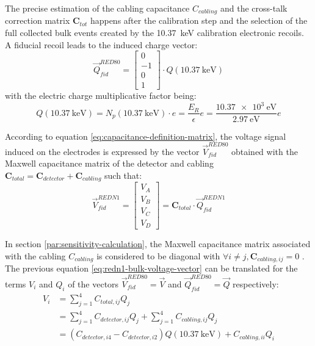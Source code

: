 The precise estimation of the cabling capacitance $C_{cabling}$ and the cross-talk correction matrix $\bm{C}_{tot}$ happens after the calibration step and the selection of the full collected bulk events created by the \SI{10.37}{\kilo\eV} calibration electronic recoils.
A fiducial recoil leads to the induced charge vector:
\begin{equation}
\vec{Q}_{fid}^{RED80} =
\begin{bmatrix}
0 \\ -1 \\ 0 \\ 1
\end{bmatrix}
\cdot Q(\SI{10.37}{\kilo\eV})
\end{equation}
with the electric charge multiplicative factor being:
\begin{equation}
Q(\SI{10.37}{\kilo\eV})
=
N_p(\SI{10.37}{\kilo\eV}) \cdot e
=
\frac{E_R}{\epsilon} e
=
\frac{\SI{10.37e3}{\eV}}{\SI{2.97}{\eV}} e
\end{equation}

According to equation \ref{eq:capacitance-definition-matrix}, the voltage signal induced on the electrodes is expressed by the vector $\vec{V}_{fid}^{RED80}$ obtained with the Maxwell capacitance matrix  of the detector and cabling $\bm{C}_{total} = \bm{C}_{detector} + \bm{C}_{cabling}$ such that:
\begin{equation}
\label{eq:redn1-bulk-voltage-vector}
\vec{V}_{fid}^{REDN1}
=
\begin{bmatrix}
V_A \\ V_B \\ V_C \\ V_D
\end{bmatrix}
=
\bm{C}_{total}
\cdot
\vec{Q}_{fid}^{REDN1}
\end{equation}

In section \ref{par:sensitivity-calculation}, the Maxwell capacitance matrix associated with the cabling $C_{cabling}$ is considered to be diagonal with $\forall i \neq j, \bm{C}_{cabling, ij} = 0$ . The previous equation \ref{eq:redn1-bulk-voltage-vector} can be translated for the terms $V_i$ and $Q_i$ of the vectors $\vec{V}_{fid}^{RED80}=\vec{V}$ and $\vec{Q}_{fid}^{RED80}=\vec{Q}$ respectively:
\begin{equation}
\begin{split}
V_{i}
&=
\sum_{j=1}^4 C_{total, ij} Q_j
\\
&=
\sum_{j=1}^4 C_{detector, ij} Q_j + \sum_{j=1}^4 C_{cabling, ij} Q_j
\\
&=
\left(
 C_{detector, i4} - C_{detector, i2}
\right)
Q(\SI{10.37}{\kilo\eV}) + C_{cabling, ii} Q_i
\end{split}
\end{equation}

